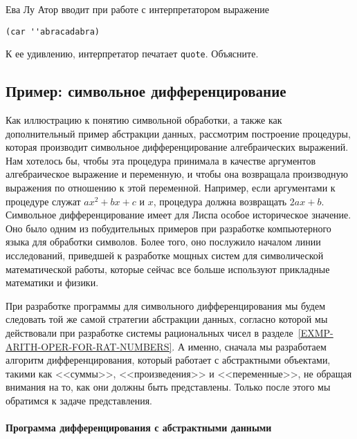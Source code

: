 \begin{exercise}{2.55}\label{EX2.55}%
Ева Лу Атор вводит при работе с интерпретатором
выражение

\begin{Verbatim}[fontsize=\small]
(car ''abracadabra)
\end{Verbatim}
К ее удивлению, интерпретатор печатает {\tt quote}.  Объясните.
\end{exercise}

\subsection{Пример: символьное дифференцирование}
\label{EXAMPLE-SYMBOLIC-DIFFERENTIATION}


Как иллюстрацию к понятию символьной
обработки, а также как дополнительный пример абстракции данных, 
рассмотрим построение процедуры,
которая производит символьное дифференцирование алгебраических
выражений.  Нам хотелось бы, чтобы эта процедура принимала в качестве
аргументов алгебраическое выражение и переменную, и чтобы она
возвращала производную выражения по отношению к этой переменной.
Например, если аргументами к процедуре служат $ax^2 + bx +
c$ и $x$, процедура должна возвращать $2ax +
b$.  Символьное дифференцирование имеет для Лиспа особое
историческое значение.  Оно было одним из побудительных примеров при
разработке компьютерного языка для обработки символов.  Более того,
оно послужило началом линии исследований, приведшей к разработке 
мощных систем для символической математической работы, которые сейчас
все больше используют прикладные математики и физики.

При разработке программы для символьного дифференцирования
мы будем следовать той же самой стратегии абстракции данных, согласно
которой мы действовали при разработке системы рациональных чисел в
разделе~\ref{EXMP-ARITH-OPER-FOR-RAT-NUMBERS}.
А именно, сначала мы разработаем алгоритм дифференцирования, который
работает с абстрактными объектами, такими как <<суммы>>,
<<произведения>> и <<переменные>>, не обращая внимания на то, как они
должны быть представлены.  Только после этого мы обратимся к задаче
представления.

\paragraph{Программа дифференцирования с абстрактными
данными}



